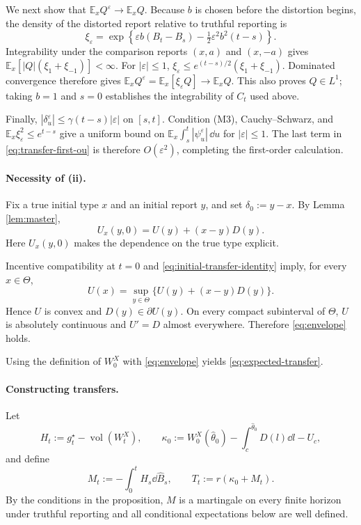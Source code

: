 \documentclass[12pt]{article}
\DeclareMathOperator{\vol}{vol}
\newcommand{\E}{\mathbb{E}}
\newcommand{\hth}{\hat\theta}
\newcommand{\hB}{\hat B}
\begin{document}
We next show that $\E_xQ^\varepsilon\to\E_xQ$.
Because $b$ is chosen before the distortion begins, the density
of the distorted report relative to truthful reporting is
\[
 \xi_\varepsilon
 =\exp\!\left\{\varepsilon b(B_t-B_s)
             -\tfrac12\varepsilon^2b^2(t-s)\right\}.
\]
Integrability under the comparison reports $(x,a)$ and $(x,-a)$
gives $\E_x[|Q|(\xi_1+\xi_{-1})]<\infty$.
For $|\varepsilon|\leq1$,
$\xi_\varepsilon\leq e^{(t-s)/2}(\xi_1+\xi_{-1})$.
Dominated convergence therefore gives
\(
 \E_xQ^\varepsilon
 =\E_x[\xi_\varepsilon Q]\longrightarrow\E_xQ.\)
This also proves $Q\in L^1$; taking $b=1$ and $s=0$
establishes the integrability of $C_t$ used above.

Finally, $|\delta_u^\varepsilon|\leq\gamma(t-s)|\varepsilon|$
on $[s,t]$. Condition (M3), Cauchy--Schwarz, and
$\E_x\xi_\varepsilon^2\leq e^{t-s}$ give a uniform bound on
$\E_x\int_s^t|\psi_u^\varepsilon|\,\dd u$ for
$|\varepsilon|\leq1$.
The last term in \eqref{eq:transfer-first-ou} is therefore
$O(\varepsilon^2)$, completing the first-order calculation.

\paragraph{Necessity of (ii).}
Fix a true initial type \(x\) and an initial report \(y\), and set
\(\delta_0:=y-x\).
By Lemma \ref{lem:master},
\begin{equation}\label{eq:initial-transfer-identity}
  U_x(y,0)=U(y)+(x-y)D(y).
\end{equation}
Here \(U_x(y,0)\) makes the dependence on the true type explicit.

Incentive compatibility at \(t=0\) and
\eqref{eq:initial-transfer-identity} imply, for every \(x\in\Theta\),
\[
  U(x)=\sup_{y\in\Theta}\{U(y)+(x-y)D(y)\}.
\]
Hence \(U\) is convex and \(D(y)\in\partial U(y)\). On every compact
subinterval of \(\Theta\), \(U\) is absolutely continuous and
\(U'=D\) almost everywhere. Therefore \eqref{eq:envelope} holds. 

Using the definition of $W_0^X$ with \eqref{eq:envelope} yields \eqref{eq:expected-transfer}.

\paragraph{Constructing transfers.}
Let
\[
  H_t:=g_t^\star-\vol(W_t^X),
  \qquad
  \kappa_0:=
  W_0^X(\hth_0)-\int_c^{\hth_0}D(l)\dd l-U_c,
\]
and define
\[
  M_t:=-\int_0^tH_s\dd\hB_s,
  \qquad
  T_t:=r(\kappa_0+M_t).
\]
By the conditions in the proposition, \(M\) is a
martingale on every finite horizon under truthful reporting and all
conditional expectations below are well defined.
\end{document}
